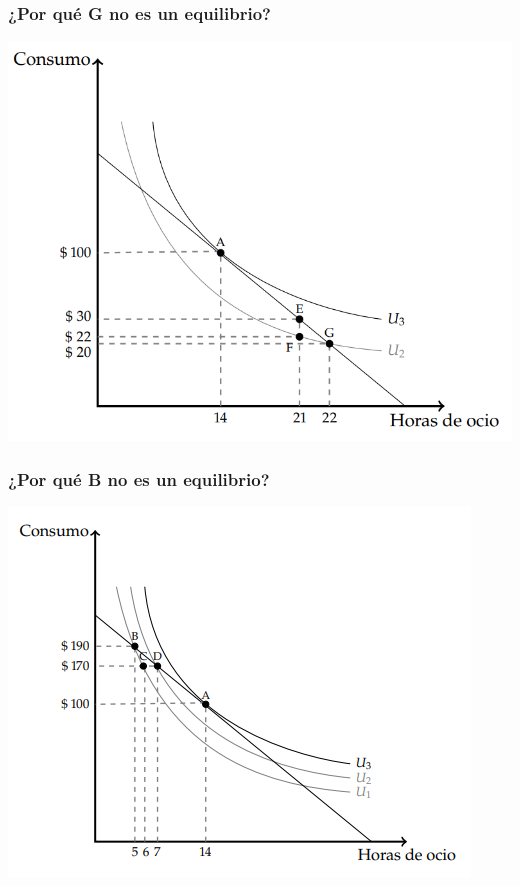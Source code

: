 \documentclass{beamer}
\begin{document}
\begin{frame}
  \frametitle{¿Por qué G no es un equilibrio?}
  \begin{center}
    \includegraphics[scale=0.5]{../Figures/C9.6.png}
  \end{center}
\end{frame}

\begin{frame}
  \frametitle{¿Por qué B no es un equilibrio?}
  \begin{center}
    \includegraphics[scale=0.8]{../Figures/C9.5.png}
  \end{center}
\end{frame}
\end{document}
